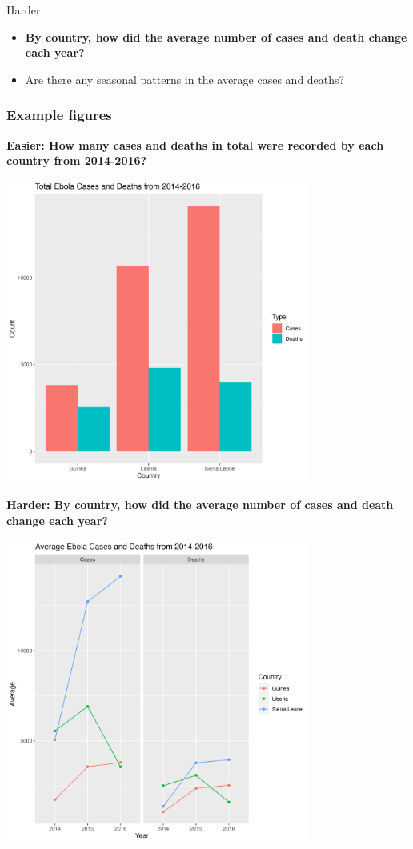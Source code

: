 \documentclass[
  letterpaper,
  DIV=11,
  numbers=noendperiod]{scrreprt}
\providecommand{\tightlist}{%
  \setlength{\itemsep}{0pt}\setlength{\parskip}{0pt}}\usepackage{longtable,booktabs,array}
\begin{document}
\begin{tcolorbox}
Harder

\begin{itemize}
\tightlist
\item
  \textbf{By country, how did the average number of cases and death
  change each year?}
\item
  Are there any seasonal patterns in the average cases and deaths?
\end{itemize}

\hypertarget{example-figures-1}{%
\subsubsection{Example figures}\label{example-figures-1}}

\textbf{Easier: How many cases and deaths in total were recorded by each
country from 2014-2016?}

\includegraphics[width=0.75\textwidth,height=\textheight]{scripts/04_projects/project-day-2_files/figs/ebola-easy.png}

\textbf{Harder: By country, how did the average number of cases and
death change each year?}

\includegraphics[width=0.75\textwidth,height=\textheight]{scripts/04_projects/project-day-2_files/figs/ebola-hard.png}

\end{tcolorbox}
\end{document}
